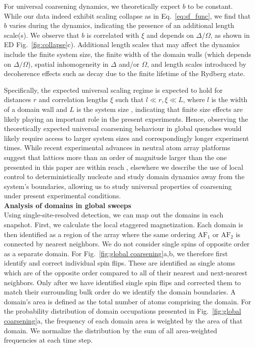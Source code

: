 \documentclass[reprint,twocolumn,secnumarabic,amssymb, aps, prx]{revtex4-2}
\begin{document}
For universal coarsening dynamics, we theoretically expect $b$ to be constant. While our data indeed exhibit scaling collapse as in Eq.~\eqref{eq:sf_func}, we find that
$b$ varies during the dynamics, indicating the presence of an additional length scale(s). We observe that $b$ is correlated with $\xi$ and depends on $\Delta/\Omega$, as shown in ED Fig.~\ref{fig:collapse}c). Additional length scales that may affect the dynamics include the finite system size, the finite width of the domain walls (which depends on $\Delta/\Omega$), spatial inhomogeneity in $\Delta$ and/or $\Omega$, and length scales introduced by decoherence effects such as  decay due to the finite lifetime of the Rydberg state. 

Specifically, the expected universal scaling regime is expected to hold for distances $r$ and correlation lengths $\xi$ such that $l\ll r,\xi\ll L $, where $l$ is the width of a domain wall and $L$ is the system size \cite{Bray1994}, indicating that finite size effects are likely playing an important role in the present experiments. Hence, observing the theoretically expected universal coarsening behaviour in global quenches would likely require access to larger system sizes and correspondingly longer experiment times.
While recent experimental advances in neutral atom array platforms suggest that lattices more than an order of magnitude larger than the one presented in this paper are within reach \cite{manetsch2024tweezer}, elsewhere we describe the use of local control to deterministically nucleate and study domain dynamics away from the system's boundaries, allowing us to study universal properties of coarsening under present experimental conditions. \\

\noindent\textbf{Analysis of domains in global sweeps }\\
Using  single-site-resolved detection, we can map out the domains in each snapshot. First, we calculate the local staggered magnetization. Each domain is then identified as a region of the array where the same ordering $\textrm{AF}_1$ or $\textrm{AF}_2$ is connected by nearest neighbors. We do not consider single spins of opposite order as a separate domain. For Fig.~\ref{fig:global coarsening}a,b, we therefore first identify and correct individual spin flips. These are identified as single atoms which are of the opposite order compared to all of their nearest and next-nearest neighbors. Only after we have identified single spin flips and corrected them to match their surrounding bulk order do we identify the domain boundaries. A domain's area is defined as the total number of atoms comprising the domain. For the probability distribution of domain occupations presented in Fig.~\ref{fig:global coarsening}a, the frequency of each domain area is weighted by the area of that domain. We normalize the distribution by the sum of all area-weighted frequencies at each time step.\\
\end{document}
